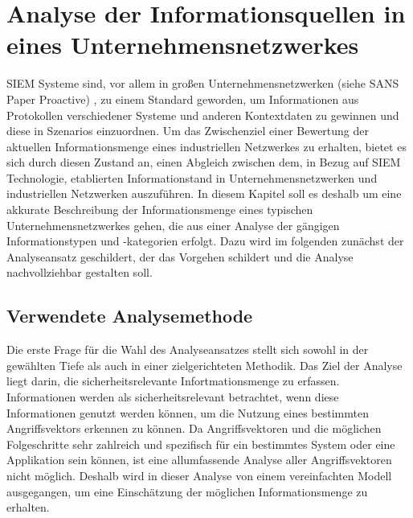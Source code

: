 \chapter{Analyse der Informationsquellen in eines Unternehmensnetzwerkes}
\label{cha:Analyse der Informationsquellen in eines Unternehmensnetzwerkes}

SIEM Systeme sind, vor allem in großen Unternehmensnetzwerken (siehe SANS Paper Proactive)
, zu einem Standard geworden, um Informationen aus Protokollen verschiedener Systeme und anderen Kontextdaten zu gewinnen und diese in Szenarios einzuordnen. Um das Zwischenziel einer Bewertung der aktuellen Informationsmenge eines industriellen Netzwerkes zu erhalten, bietet es sich durch diesen Zustand an, einen Abgleich zwischen dem, in Bezug auf SIEM Technologie, etablierten Informationstand in Unternehmensnetzwerken und industriellen Netzwerken auszuführen. In diesem Kapitel soll es deshalb um eine akkurate Beschreibung der Informationsmenge eines typischen Unternehmensnetzwerkes gehen, die aus einer Analyse der gängigen Informationstypen und -kategorien erfolgt. Dazu wird im folgenden zunächst der Analyseansatz geschildert, der das Vorgehen schildert und die Analyse nachvollziehbar gestalten soll.

\section{Verwendete Analysemethode}


Die erste Frage für die Wahl des Analyseansatzes stellt sich sowohl in der gewählten Tiefe als auch in einer zielgerichteten Methodik. Das Ziel der Analyse liegt darin, die sicherheitsrelevante Infortmationsmenge zu erfassen. Informationen werden als sicherheitsrelevant betrachtet, wenn diese Informationen genutzt werden können, um die Nutzung eines bestimmten Angriffsvektors erkennen zu können. Da Angriffsvektoren und die möglichen Folgeschritte sehr zahlreich und spezifisch für ein bestimmtes System oder eine Applikation sein können, ist eine allumfassende Analyse aller Angriffsvektoren nicht möglich. Deshalb wird in dieser Analyse von einem vereinfachten Modell ausgegangen, um eine Einschätzung der möglichen Informationsmenge zu erhalten. 

